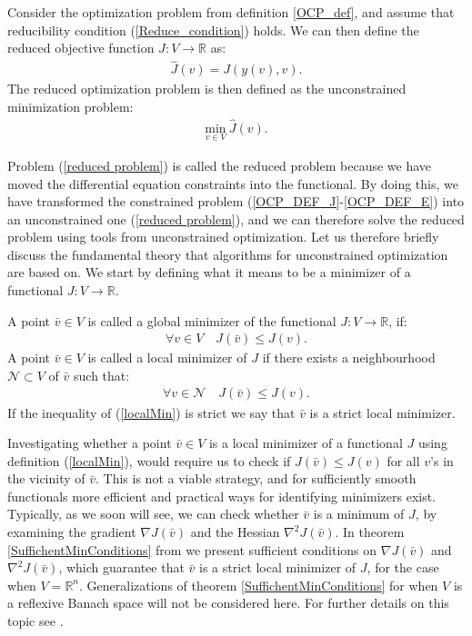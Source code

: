 \begin{definition} \label{DEF_RED_OCP}
Consider the optimization problem from definition \ref{OCP_def}, and assume that reducibility condition (\ref{Reduce_condition}) holds. We can then define the reduced objective function $\hat J:V\rightarrow\mathbb{R}$ as:
\begin{align}
\hat J(v) = J(y(v),v). \label{ROF}
\end{align}
The reduced optimization problem is then defined as the unconstrained minimization problem:
\begin{align}
\underset{v\in V}{\text{min}} \ \hat J(v). \label{reduced problem}
\end{align}
\end{definition} 
\noindent
Problem (\ref{reduced problem}) is called the reduced problem because we have moved the differential equation constraints into the functional. By doing this, we have transformed the constrained problem (\ref{OCP_DEF_J}-\ref{OCP_DEF_E}) into an unconstrained one (\ref{reduced problem}), and we can therefore solve the reduced problem using tools from unconstrained optimization. Let us therefore briefly discuss the fundamental theory that algorithms for unconstrained optimization are based on. We start by defining what it means to be a minimizer of a functional $J: V \rightarrow \mathbb{R}$.
\begin{definition}
A point $\bar{v}\in V$ is called a global minimizer of the functional $J: V \rightarrow \mathbb{R}$, if:
\begin{align}
\forall v\in V \quad J(\bar{v})\leq J(v).\label{globalMin}
\end{align}
A point $\bar{v}\in V$ is called a local minimizer of $J$ if there exists a neighbourhood $\mathcal{N}\subset V$ of $\bar{v}$ such that:
\begin{align}
\forall v\in \mathcal{N} \quad J(\bar{v})\leq J(v). \label{localMin}
\end{align}
If the inequality of (\ref{localMin}) is strict we say that $\bar{v}$ is a strict local minimizer.
\end{definition}
\noindent
Investigating whether a point $\bar v\in V$ is a local minimizer of a functional $J$ using definition (\ref{localMin}), would require us to check if $J(\bar v)\leq J(v)$ for all $v$'s in the vicinity of $\bar v$. This is not a viable strategy, and for sufficiently smooth functionals more efficient and practical ways for identifying minimizers exist. Typically, as we soon will see, we can check whether $\bar v$ is a minimum of $J$, by examining the gradient $\nabla J(\bar v)$ and the Hessian $\nabla^2 J(\bar v)$. In theorem \ref{SuffichentMinConditions} from \cite{nocedal2006numerical} we present sufficient conditions on $\nabla J(\bar v)$ and $\nabla^2 J(\bar v)$, which guarantee that $\bar v$ is a strict local minimizer of $J$, for the case when $V=\mathbb{R}^n$. Generalizations of theorem \ref{SuffichentMinConditions} for when $V$ is a reflexive Banach space will not be considered here. For further details on this topic see \cite{hinze2008optimization}.
